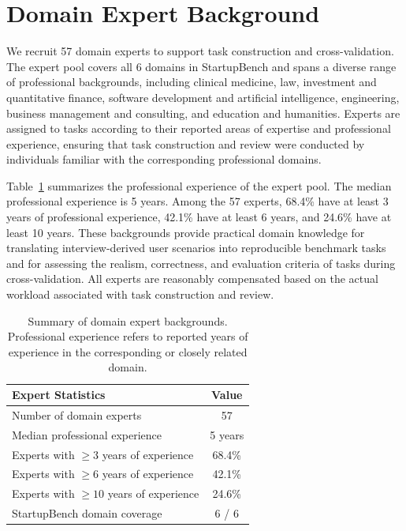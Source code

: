 \section{Domain Expert Background}
\label{app:expert background}
We recruit 57 domain experts to support task construction and cross-validation. The expert pool covers all 6 domains in StartupBench and spans a diverse range of professional backgrounds, including clinical medicine, law, investment and quantitative finance, software development and artificial intelligence, engineering, business management and consulting, and education and humanities. Experts are assigned to tasks according to their reported areas of expertise and professional experience, ensuring that task construction and review were conducted by individuals familiar with the corresponding professional domains.

Table~\ref{tab:expert_background} summarizes the professional experience of the expert pool. The median professional experience is 5 years. Among the 57 experts, 68.4\% have at least 3 years of professional experience, 42.1\% have at least 6 years, and 24.6\% have at least 10 years. These backgrounds provide practical domain knowledge for translating interview-derived user scenarios into reproducible benchmark tasks and for assessing the realism, correctness, and evaluation criteria of tasks during cross-validation. All experts are reasonably compensated based on the actual workload associated with task construction and review.

\begin{table}[t]
\centering
\small
\caption{Summary of domain expert backgrounds. Professional experience refers to reported years of experience in the corresponding or closely related domain.}
\label{tab:expert_background}
\begin{tabular}{lc}
\toprule
\textbf{Expert Statistics} & \textbf{Value} \\
\midrule
Number of domain experts                  & 57    \\
Median professional experience            & 5 years \\
Experts with $\geq 3$ years of experience & 68.4\% \\
Experts with $\geq 6$ years of experience & 42.1\% \\
Experts with $\geq 10$ years of experience & 24.6\% \\
StartupBench domain coverage              & 6 / 6 \\
\bottomrule
\end{tabular}
\end{table}


